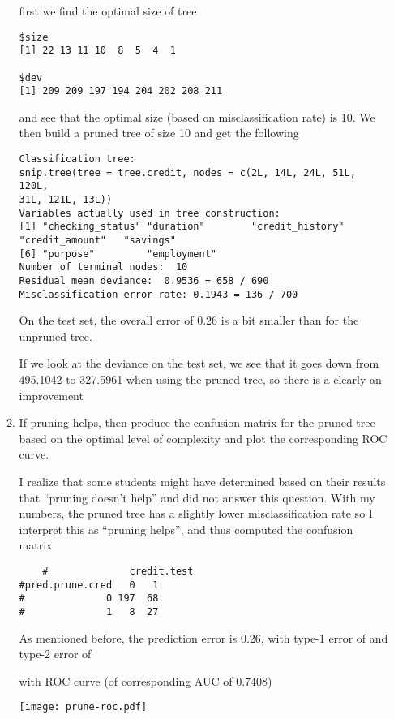 \documentclass[11pt]{article}
\begin{document}
\begin{enumerate}
\begin{enumerate}
   first we find the optimal size of tree
  
  
  \begin{verbatim}
$size
[1] 22 13 11 10  8  5  4  1

$dev
[1] 209 209 197 194 204 202 208 211
\end{verbatim}
and see that the optimal size (based on misclassification rate) is 10. We then build a pruned tree of size 10 and get the following 

  
 \begin{verbatim}  
Classification tree:
snip.tree(tree = tree.credit, nodes = c(2L, 14L, 24L, 51L, 120L, 
31L, 121L, 13L))
Variables actually used in tree construction:
[1] "checking_status" "duration"        "credit_history"  "credit_amount"   "savings"        
[6] "purpose"         "employment"     
Number of terminal nodes:  10 
Residual mean deviance:  0.9536 = 658 / 690 
Misclassification error rate: 0.1943 = 136 / 700 
\end{verbatim}

On the test set, the overall error of 0.26 is a bit smaller than for the unpruned tree.

If we look at the deviance on the test set, we see that it goes down from 495.1042 to 327.5961 when using the pruned tree, so there is a clearly an improvement
  
    \item If pruning helps, then produce the confusion matrix for the pruned tree based on the optimal level of complexity and plot the corresponding ROC curve.
    
     I realize that some students might have determined based on their results that ``pruning doesn't help'' and did not answer this question. With my numbers, the pruned tree has a slightly lower misclassification rate so I interpret this  as ``pruning helps'', and thus computed the confusion matrix
    
    \begin{verbatim}
    #              credit.test
#pred.prune.cred   0   1
#              0 197  68
#              1   8  27
\end{verbatim}

As mentioned before, the prediction error is 0.26, with type-1 error of and type-2 error of 

with ROC curve (of corresponding AUC of 0.7408)

\texttt{[image: prune-roc.pdf]}
    

\end{enumerate}
\end{enumerate}
\end{document}
